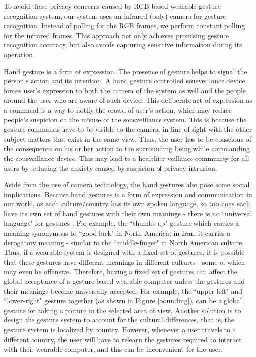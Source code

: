 To avoid these privacy concerns caused by RGB based wearable gesture recognition system, our system uses an infrared (only) camera for gesture recognition.  Instead of polling for the RGB frames, we perform constant polling for the infrared frames. This approach not only achieves promising gesture recognition accuracy, but also avoids capturing sensitive information during its operation. 

Hand gesture is a form of expression. The presence of gesture helps to signal the person's action and its intention. A hand gesture controlled sousveillance device forces user's expression to both the camera of the system as well and the people around the user who are aware of such device. This deliberate act of expression as a command is a way to notify the crowd of user's action, which may reduce people's suspicion on the misuse of the sousveillance system. This is because the gesture commands have to be visible to the camera, in line of sight with the other subject matters that exist in the same view. Thus, the user has to be conscious of the consequence on his or her action to the surrounding being while commanding the sousveillance device. This may lead to a healthier veillance community for all users by reducing the anxiety caused by suspicion of privacy intrusion.

Aside from the use of camera technology, the hand gestures also pose some social implications. Because hand gestures is a form of expression and communication in our world, as each culture/country has its own spoken language, so too does each have its own set of hand gestures with their own meanings - there is no ``universal language" for gestures \cite{archer1997unspoken}. For example, the ``thumbs-up" gesture which carries a meaning synonymous to ``good-luck" in North America; in Iran, it carries a derogatory meaning - similar to the ``middle-finger" in North American culture. Thus, if a wearable system is designed with a fixed set of gestures, it is possible that these gestures have different meanings in different cultures - some of which may even be offensive. Therefore, having a fixed set of gestures can affect the global acceptance of a gesture-based wearable computer unless the gestures and their meanings become universally accepted. For example, the ``upper-left" and ``lower-right" gesture together (as shown in Figure \ref{bounding}), can be a global gesture for taking a picture in the selected area of view. Another solution is to design the gesture system to account for the cultural differences, that is, the gesture system is localized by country. However, whenever a user travels to a different country, the user will have to relearn the gestures required to interact with their wearable computer, and this can be inconvenient for the user.

